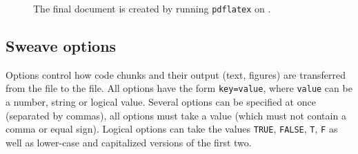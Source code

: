 \documentclass[a4paper]{article}
\begin{document}
\begin{figure}[htbp]
  \centering
  \caption{The final document is created by running \texttt{pdflatex} on
    .}
  \label{fig:ex1.pdf}
\end{figure}


\subsection{Sweave options}

Options control how code chunks and their output (text, figures) are
transferred from the  file to the  file. All
options have the form \texttt{key=value}, where \texttt{value} can be
a number, string or logical value.  Several options can be specified at
once (separated by commas), all options must take a value (which must
not contain a comma or equal sign). Logical options can take the
values \texttt{TRUE}, \texttt{FALSE}, \texttt{T}, \texttt{F} as well
as lower-case and capitalized versions of the first two.
\end{document}
